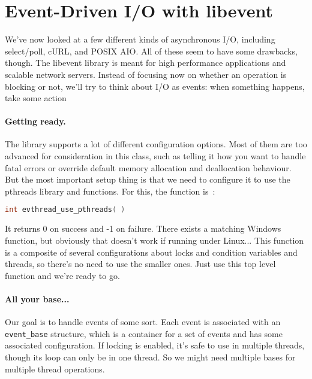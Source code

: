 




\section*{Event-Driven I/O with libevent}

We've now looked at a few different kinds of asynchronous I/O, including select/poll, cURL, and POSIX AIO. All of these seem to have some drawbacks, though. The libevent library is meant for high performance applications and scalable network servers. Instead of focusing now on whether an operation is blocking or not, we'll try to think about I/O as events: when something happens, take some action

\paragraph{Getting ready.} The library supports a lot of different configuration options. Most of them are too advanced for consideration in this class, such as telling it how you want to handle fatal errors or override default memory allocation and deallocation behaviour. But the most important setup thing is that we need to configure it to use the pthreads library and functions. For this, the function is~\cite{libevent}:

\begin{lstlisting}[language=C]
int evthread_use_pthreads( )
\end{lstlisting}

It returns 0 on success and -1 on failure. There exists a matching Windows function, but obviously that doesn't work if running under Linux... This function is a composite of several configurations about locks and condition variables and threads, so there's no need to use the smaller ones. Just use this top level function and we're ready to go.

\paragraph{All your base...} Our goal is to handle events of some sort. Each event is associated with an \texttt{event\_base} structure, which is a container for a set of events and has some associated configuration. If locking is enabled, it's safe to use in multiple threads, though its loop can only be in one thread. So we might need multiple bases for multiple thread operations.

